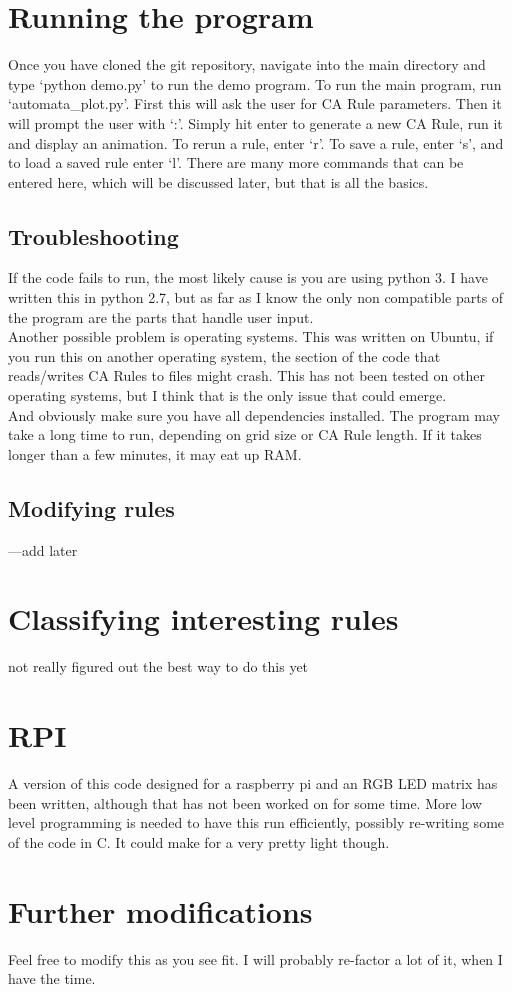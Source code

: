 \documentclass{article}
\begin{document}
	\section{Running the program}
	Once you have cloned the git repository, navigate into the main directory and type `python demo.py' to run the demo program. To run the main program, run `automata\_plot.py'. First this will ask the user for CA Rule parameters. Then it will prompt the user with `:'. Simply hit enter to generate a new CA Rule, run it and display an animation. To rerun a rule, enter `r'. To save a rule, enter `s', and to load a saved rule enter `l'. There are many more commands that can be entered here, which will be discussed later, but that is all the basics.
	\subsection{Troubleshooting}
	If the code fails to run, the most likely cause is you are using python 3. I have written this in python 2.7, but as far as I know the only non compatible parts of the program are the parts that handle user input.\\
	
	Another possible problem is operating systems. This was written on Ubuntu, if you run this on another operating system, the section of the code that reads/writes CA Rules to files might crash. This has not been tested on other operating systems, but I think that is the only issue that could emerge.\\
	
	And obviously make sure you have all dependencies installed. The program may take a long time to run, depending on grid size or CA Rule length. If it takes longer than a few minutes, it may eat up RAM.
	
	\subsection{Modifying rules}
	---add later
	\section{Classifying interesting rules}
	not really figured out the best way to do this yet
	\section{RPI}
	A version of this code designed for a raspberry pi and an RGB LED matrix has been written, although that has not been worked on for some time. More low level programming is needed to have this run efficiently, possibly re-writing some of the code in C. It could make for a very pretty light though.
	\section{Further modifications}
	Feel free to modify this as you see fit. I will probably re-factor a lot of it, when I have the time.
\end{document}
